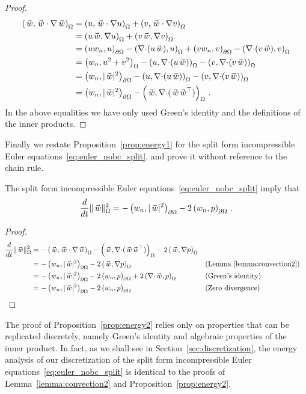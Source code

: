 \begin{proof}
  \begin{align*}
    \ipc{\wc}{\wc \cdot \nabla \wc}
      &= \ipc{u}{\wc \cdot \nabla u} + \ipc{v}{\wc \cdot \nabla v} \\
      &= \ipc{u\wc}{\nabla u} + \ipc{v\wc}{\nabla v} \\
      &= \ipbc{u\wcn}{u} - \ipc{\div (u\wc)}{u} + \ipbc{v\wcn}{v} - \ipc{\div (v\wc)}{v} \\
      &= \ipc{\wcn}{u^2+v^2} - \ipc{u}{\div (u\wc)} - \ipc{v}{\div (v\wc)} \\
      &= \ipbc{\wcn}{|\wc|^2} - \ipc{u}{\div (u\wc)} - \ipc{v}{\div (v\wc)} \\
      &= \ipbc{\wcn}{|\wc|^2} - \ipc{\wc}{\div (\wc \wc^\top)} \,.
  \end{align*}
  In the above equalities we have only used Green's identity and the definitions of the inner products.
\end{proof}
Finally we restate Proposition~\ref{prop:energy1} for the split form incompressible Euler equations~\eqref{eq:euler_nobc_split}, and prove it without reference to the chain rule.

\begin{proposition}\label{prop:energy2}
   The split form incompressible Euler equations~\eqref{eq:euler_nobc_split} imply that
  \begin{equation*}
    \frac{d}{dt} \normc{\wc}^2 = -\ipbc{\wcn}{|\wc|^2} - 2\ipbc{\wcn}{p}\,.
  \end{equation*}
\end{proposition}

\begin{proof}
  \begin{align*}
    \frac{d}{dt} \normc{\wc}^2
      &= -\ipc{\wc}{\wc \cdot \nabla \wc} -\ipc{\wc}{\div (\wc \wc^\top)} - 2\ipc{\wc}{\nabla p} \\
      &= -\ipbc{\wcn}{|\wc|^2} - 2\ipc{\wc}{\nabla p} &&\text{(Lemma~\ref{lemma:convection2})} \\
      &= -\ipbc{\wcn}{|\wc|^2} - 2\ipbc{\wcn}{p} + 2\ipc{\div \wc}{p} &&\text{(Green's identity)} \\
      &= -\ipbc{\wcn}{|\wc|^2} - 2\ipbc{\wcn}{p} &&\text{(Zero divergence)} \\
  \end{align*}
\end{proof}

\begin{remark}
  The proof of Proposition~\ref{prop:energy2} relies only on properties that can be replicated discretely, namely Green's identity and algebraic properties of the inner product. In fact, as we shall see in Section~\ref{sec:discretization}, the energy analysis of our discretization of the split form incompressible Euler equations~\eqref{eq:euler_nobc_split} is identical to the proofs of Lemma~\ref{lemma:convection2} and Proposition~\ref{prop:energy2}.
\end{remark}

